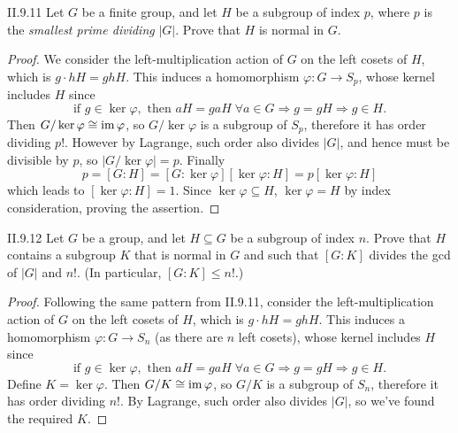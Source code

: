 \begin{problem}{II.9.11}
Let $G$ be a finite group, and let $H$ be a subgroup of index $p$, where $p$ is the \emph{smallest prime dividing} $|G|$. Prove that $H$ is normal in $G$.
\end{problem}
\begin{proof}
We consider the left-multiplication action of $G$ on the left cosets of $H$, which is $g \cdot hH = ghH$. This induces a homomorphism $\varphi : G \to S_p$, whose kernel includes $H$ since
\[
\text{if } g \in \ker \varphi, \text{ then } aH = gaH \; \forall a \in G \Rightarrow g = gH \Rightarrow g \in H.
\]
Then $G/\ker \varphi \cong \operatorname{im} \varphi$, so $G/\ker \varphi$ is a subgroup of $S_p$, therefore it has order dividing $p!$. However by Lagrange, such order also divides $|G|$, and hence must be divisible by $p$, so $|G/\ker \varphi| = p$. Finally
\[
p = [G : H] = [G : \ker \varphi][\ker \varphi : H] = p[\ker \varphi : H]
\]
which leads to $[\ker \varphi : H] = 1$. Since $\ker \varphi \subseteq H$, $\ker \varphi = H$ by index consideration, proving the assertion. 
\end{proof}

\begin{problem}{II.9.12}
Let $G$ be a group, and let $H \subseteq G$ be a subgroup of index $n$. Prove that $H$ contains a subgroup $K$ that is normal in $G$ and such that $[G : K]$ divides the gcd of $|G|$ and $n!$. (In particular, $[G:K] \leq n!$.)
\end{problem}
\begin{proof}
Following the same pattern from II.9.11, consider the left-multiplication action of $G$ on the left cosets of $H$, which is $g \cdot hH = ghH$. This induces a homomorphism $\varphi : G \to S_n$ (as there are $n$ left cosets), whose kernel includes $H$ since
\[
\text{if } g \in \ker \varphi, \text{ then } aH = gaH \; \forall a \in G \Rightarrow g = gH \Rightarrow g \in H.
\]
Define $K = \ker \varphi$. Then $G/K \cong \operatorname{im} \varphi$, so $G/K$ is a subgroup of $S_n$, therefore it has order dividing $n!$. By Lagrange, such order also divides $|G|$, so we've found the required $K$.
\end{proof}

